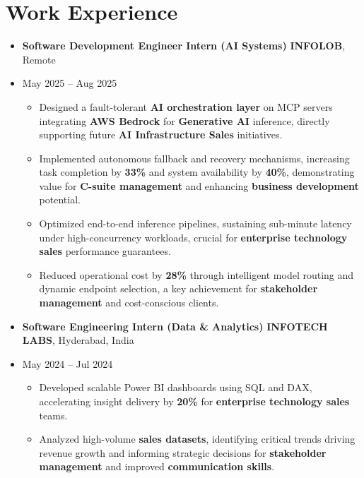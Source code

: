 \documentclass[letterpaper,10pt]{article}
\begin{document}
\section*{Work Experience}
\begin{itemize}
    \item \textbf{Software Development Engineer Intern (AI Systems)} \hfill \textbf{INFOLOB}, Remote
    \item May 2025 – Aug 2025
    \begin{itemize} %
        \item Designed a fault-tolerant \textbf{AI orchestration layer} on MCP servers integrating \textbf{AWS Bedrock} for \textbf{Generative AI} inference, directly supporting future \textbf{AI Infrastructure Sales} initiatives.
        \item Implemented autonomous fallback and recovery mechanisms, increasing task completion by \textbf{33\%} and system availability by \textbf{40\%}, demonstrating value for \textbf{C-suite management} and enhancing \textbf{business development} potential.
        \item Optimized end-to-end inference pipelines, sustaining sub-minute latency under high-concurrency workloads, crucial for \textbf{enterprise technology sales} performance guarantees.
        \item Reduced operational cost by \textbf{28\%} through intelligent model routing and dynamic endpoint selection, a key achievement for \textbf{stakeholder management} and cost-conscious clients.
    \end{itemize}

    \item \textbf{Software Engineering Intern (Data \& Analytics)} \hfill \textbf{INFOTECH LABS}, Hyderabad, India
    \item May 2024 – Jul 2024
    \begin{itemize} %
        \item Developed scalable Power BI dashboards using SQL and DAX, accelerating insight delivery by \textbf{20\%} for \textbf{enterprise technology sales} teams.
        \item Analyzed high-volume \textbf{sales datasets}, identifying critical trends driving revenue growth and informing strategic decisions for \textbf{stakeholder management} and improved \textbf{communication skills}.
    \end{itemize}
\end{itemize}
\end{document}
